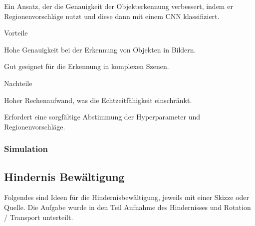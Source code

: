 Ein Ansatz, der die Genauigkeit der Objekterkennung verbessert, indem er Regionenvorschläge nutzt und diese dann mit einem CNN klassifiziert.

\begin{minipage}[t]{0.48\textwidth}
    \begin{items}
      \item [Vorteile]
      \item Hohe Genauigkeit bei der Erkennung von Objekten in Bildern.
      \item Gut geeignet für die Erkennung in komplexen Szenen.
    \end{items}
\end{minipage}
\hfill
\begin{minipage}[t]{0.48\textwidth}
    \begin{items}
      \item [Nachteile]
      \item Hoher Rechenaufwand, was die Echtzeitfähigkeit einschränkt.
      \item Erfordert eine sorgfältige Abstimmung der Hyperparameter und Regionenvorschläge.
    \end{items}
\end{minipage}

\subsubsection{Simulation}


\newpage
\subsection{Hindernis Bewältigung}
Folgendes sind Ideen für die Hindernisbewältigung, jeweils mit einer Skizze oder Quelle. Die Aufgabe wurde in den Teil Aufnahme des Hindernisses und Rotation / Transport unterteilt.
